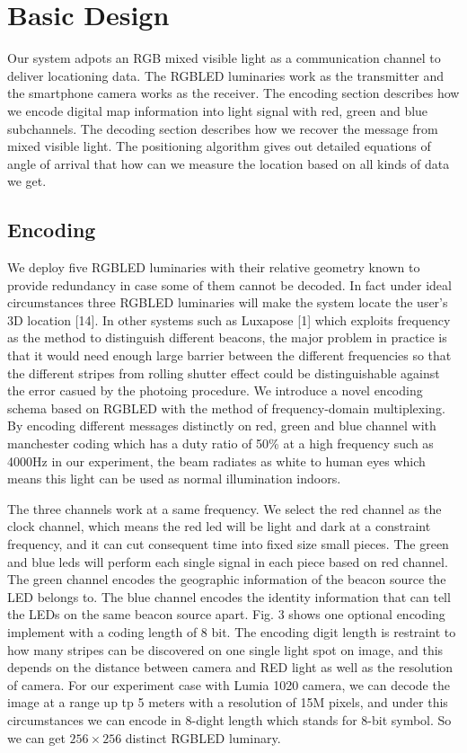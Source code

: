 \documentclass[conference]{IEEEtran}
\begin{document}
\section{Basic Design}
Our system adpots an RGB mixed visible light as a communication channel to deliver locationing data. The RGBLED luminaries work as the transmitter and the smartphone camera works as the receiver. The encoding section describes how we encode digital map information into light signal with red, green and blue subchannels. The decoding section describes how we recover the message from mixed visible light. The positioning algorithm gives out detailed equations of angle of arrival that how can we measure the location based on all kinds of data we get.

\subsection{Encoding}
We deploy five RGBLED luminaries with their relative geometry known to provide redundancy in case some of them cannot be decoded. In fact under ideal circumstances three RGBLED luminaries will make the system locate the user's 3D location [14]. In other systems such as Luxapose [1] which exploits frequency as the method to distinguish different beacons, the major problem in practice is that it would need enough large barrier between the different frequencies so that the different stripes from rolling shutter effect could be distinguishable against the error casued by the photoing procedure. 
We introduce a novel encoding schema based on RGBLED with the method of frequency-domain multiplexing. By encoding different messages distinctly on red, green and blue channel with manchester coding which has a duty ratio of 50\% at a high frequency such as 4000Hz in our experiment, the beam radiates as white to human eyes which means this light can be used as normal illumination indoors.

The three channels work at a same frequency. We select the red channel as the clock channel, which means the red led will be light and dark at a constraint frequency, and it can cut consequent time into fixed size small pieces. The green and blue leds will perform each single signal in each piece based on red channel. The green channel encodes the geographic information of the beacon source the LED belongs to. The blue channel encodes the identity information that can tell the LEDs on the same beacon source apart. Fig. 3 shows one optional encoding implement with a coding length of 8 bit. The encoding digit length is restraint to how many stripes can be discovered on one single light spot on image, and this depends on the distance between camera and RED light as well as the resolution of camera. For our experiment case with Lumia 1020 camera, we can decode the image at a range up tp 5 meters with a resolution of 15M pixels, and under this circumstances we can encode in 8-dight length which stands for 8-bit symbol. So we can get $256 \times 256$ distinct RGBLED luminary. 
\end{document}

